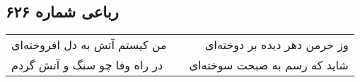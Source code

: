 \begin{center}
\section*{رباعی شماره ۶۲۶}
\label{sec:sh626}
\begin{longtable}{l p{0.5cm} r}
من کیستم آتش به دل افروخته‌ای
&&
وز خرمن دهر دیده بر دوخته‌ای
\\
در راه وفا چو سنگ و آتش گردم
&&
شاید که رسم به صبحت سوخته‌ای
\\
\end{longtable}
\end{center}
